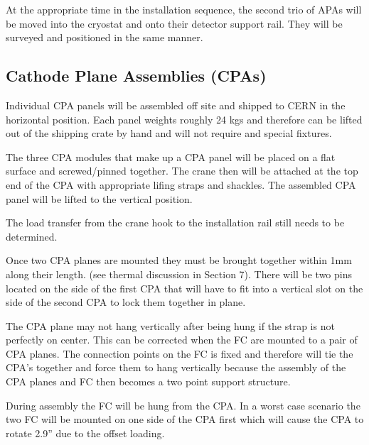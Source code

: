 At the appropriate time in the installation sequence, the second trio of APAs will be moved into the cryostat and onto their detector support rail.  They will be surveyed and positioned in the same manner.


\subsection{Cathode Plane Assemblies (CPAs)}



Individual CPA panels will be assembled off site and shipped to CERN in the horizontal position.  Each panel weights roughly 24 kgs and therefore can be lifted out of the shipping crate by hand and will not require and special fixtures.

The three CPA modules that make up a CPA panel will be placed on a flat surface and screwed/pinned together.   The crane then will be attached at the top end of the CPA with appropriate lifing straps and shackles.  The assembled CPA panel will be lifted to the vertical position.  

The load transfer from the crane hook to the installation rail still needs to be determined.  

Once two CPA planes are mounted they must be brought together within 1mm along their length.  (see thermal discussion in Section 7).  There will be two pins located on the side of the first CPA that will have to fit into a vertical slot on the side of the second CPA to lock them together in plane.  

The CPA plane may not hang vertically after being hung if the strap is not perfectly on center.  This can be corrected when the FC are mounted to a pair of CPA planes.  The connection points on the FC is fixed and therefore will tie the CPA’s together and force them to hang vertically because the assembly of the CPA planes and FC then becomes a two point support structure.  

During assembly the FC will be hung from the CPA.  In a worst case scenario the two FC will be mounted on one side of the CPA first which will cause the CPA to rotate 2.9'' due to the offset loading.  



